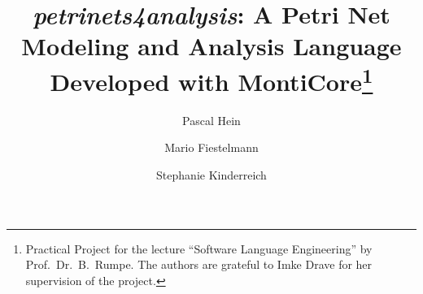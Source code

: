 \documentclass[runningheads,envcountsect,envcountsame,a4paper]{lncs/llncs}
\begin{document}
\title{\emph{petrinets4analysis}: A Petri Net Modeling and Analysis Language Developed with MontiCore\thanks{Practical Project for the lecture ``Software Language Engineering'' by Prof.\ Dr.\ B.\ Rumpe. The authors are grateful to Imke Drave for her supervision of the project.}}


\author{Pascal Hein \and
Mario Fiestelmann \and
Stephanie Kinderreich}


\maketitle










\end{document}
